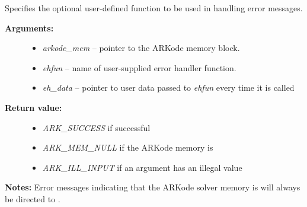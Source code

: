 \documentclass[letterpaper,10pt,english]{sphinxmanual}
\begin{document}
\begin{fulllineitems}
\label{c_interface/User_callable:ARKodeSetErrHandlerFn}
Specifies the optional user-defined function to be used
in handling error messages.
\begin{description}
\item[{\textbf{Arguments:}}] \leavevmode\begin{itemize}
\item {} 
\emph{arkode\_mem} -- pointer to the ARKode memory block.

\item {} 
\emph{ehfun} -- name of user-supplied error handler function.

\item {} 
\emph{eh\_data} -- pointer to user data passed to \emph{ehfun} every time
it is called

\end{itemize}

\item[{\textbf{Return value:}}] \leavevmode\begin{itemize}
\item {} 
\emph{ARK\_SUCCESS} if successful

\item {} 
\emph{ARK\_MEM\_NULL} if the ARKode memory is 

\item {} 
\emph{ARK\_ILL\_INPUT} if an argument has an illegal value

\end{itemize}

\end{description}

\textbf{Notes:} Error messages indicating that the ARKode solver memory is
 will always be directed to .

\end{fulllineitems}

\end{document}
